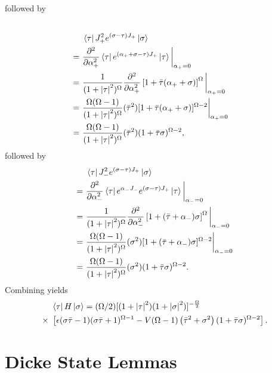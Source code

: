 \documentclass[10pt]{article}
\begin{document}
\begin{appendices}
followed by
\begin{align}
\\
&\bra{\tau}J^2_+e^{(\sigma-\tau) J_+}\ket{\sigma}
\nonumber
\\
= \ &
\frac{\partial^2}{\partial\alpha^2_+}\bra{\tau}e^{(\alpha_++\sigma-\tau) J_+}\ket{\tau}\bigg{|}_{\alpha_+=0}
\nonumber
\\
= \ &
\frac{1}{(1+\abs{\tau}^2)^{\Omega}}\frac{\partial^2}{\partial\alpha^2_+}\left[1+\bar{\tau}(\alpha_++\sigma)\right]^{\Omega}\bigg{|}_{\alpha_+=0}
\nonumber
\\
= \ &
\frac{\Omega(\Omega-1)}{(1+\abs{\tau}^2)^{\Omega}}(\bar{\tau}^2)[1+\bar{\tau}(\alpha_++\sigma)]^{\Omega-2}\bigg{|}_{\alpha_+=0}
\nonumber
\\
= \ &
\frac{\Omega(\Omega-1)}{(1+\abs{\tau}^2)^{\Omega}}(\bar{\tau}^2)(1+\bar{\tau}\sigma)^{\Omega-2},
\end{align}
followed by
\begin{align}
&\bra{\tau}J^2_-e^{(\sigma-\tau) J_+}\ket{\sigma}
\nonumber
\\
= \ &
\frac{\partial^2}{\partial\alpha^2_-}\bra{\tau}e^{\alpha_-J_-}e^{(\sigma-\tau) J_+}\ket{\tau}\bigg{|}_{\alpha_-=0}
\nonumber
\\
= \ &
\frac{1}{(1+\abs{\tau}^2)^{\Omega}}\frac{\partial^2}{\partial\alpha^2_-}\left[1+(\bar{\tau}+\alpha_-)\sigma\right]^{\Omega}\bigg{|}_{\alpha_-=0}
\nonumber
\\
= \ &
\frac{\Omega(\Omega-1)}{(1+\abs{\tau}^2)^{\Omega}}(\sigma^2)[1+(\bar{\tau}+\alpha_-)\sigma]^{\Omega-2}\bigg{|}_{\alpha_-=0}
\nonumber
\\
= \ &
\frac{\Omega(\Omega-1)}{(1+\abs{\tau}^2)^{\Omega}}(\sigma^2)(1+\bar{\tau}\sigma)^{\Omega-2}.
\end{align}
Combining yields
\begin{align}
\label{ths}
&\bra{\tau}H\ket{\sigma}
=
(\Omega/2)[(1+\abs{\tau}^2)(1+\abs{\sigma}^2)]^{-\frac{\Omega}{2}}
\nonumber
\\
\times \ &\left[ 
\epsilon(\sigma\bar{\tau}-1)(\sigma\bar{\tau}+1)^{\Omega-1}-V(\Omega-1)\left(\bar{\tau}^2+\sigma^2\right)(1+\bar{\tau}\sigma)^{\Omega-2}
\right].
\end{align}

\chapter{Dicke State Lemmas}
\label{app:dicke_state_lemmas}


\end{appendices}
\end{document}
